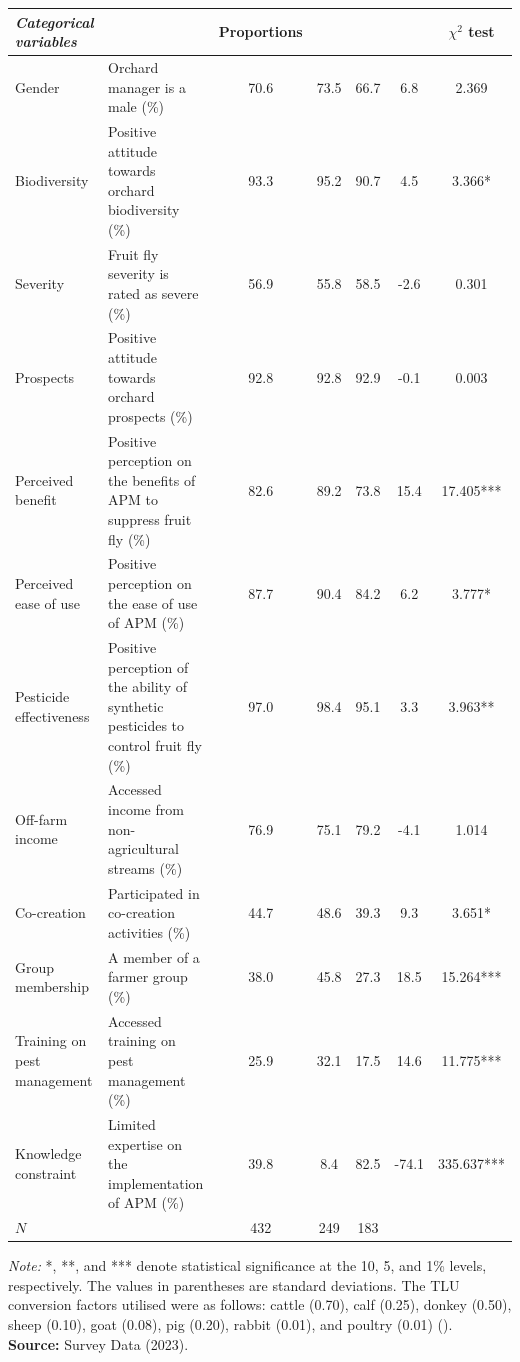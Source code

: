 \documentclass[fleqn,twoside,reqno]{article}
\begin{document}
\begin{table}
\begin{adjustbox}{width=1\textwidth, center}
\begin{tabular}{l >{\raggedright\arraybackslash}p{8cm} ccccc}
            \midrule
            \textbf{\textit{Categorical variables}} & & Proportions & & & & $\chi^2$ test\\
            \midrule
            Gender & Orchard manager is a male (\%) & 70.6 & 73.5 & 66.7 & 6.8 & 2.369 \\
            Biodiversity & Positive attitude towards orchard biodiversity (\%) & 93.3 & 95.2 & 90.7 & 4.5 &3.366*\\
            Severity & Fruit fly severity is rated as severe (\%) & 56.9 & 55.8 & 58.5 & -2.6 & 0.301 \\
            Prospects & Positive attitude towards orchard prospects (\%) & 92.8 & 92.8 & 92.9 & -0.1 & 0.003\\
            Perceived benefit & Positive perception on the benefits of APM to suppress fruit fly (\%) & 82.6 & 89.2 & 73.8 & 15.4 & 17.405***\\
            Perceived ease of use & Positive perception on the ease of use of APM (\%) & 87.7 & 90.4 & 84.2 & 6.2 & 3.777*\\
            Pesticide effectiveness & Positive perception of the ability of synthetic pesticides to control fruit fly (\%) & 97.0 & 98.4 & 95.1 & 3.3 & 3.963**\\
            Off-farm income & Accessed income from non-agricultural streams (\%) & 76.9 & 75.1 & 79.2 & -4.1 & 1.014\\
            Co-creation & Participated in co-creation activities (\%) & 44.7 & 48.6 & 39.3 & 9.3 & 3.651*\\
            Group membership & A member of a farmer group (\%) & 38.0 & 45.8 & 27.3 & 18.5 & 15.264***\\
            Training on pest management & Accessed training on pest management (\%) & 25.9 & 32.1 & 17.5 & 14.6 & 11.775***\\
            Knowledge constraint & Limited expertise on the implementation of APM (\%) & 39.8 & 8.4 & 82.5 & -74.1 & 335.637***\\
            \midrule
            $N$ & & 432 & 249 & 183 & & \\
            \bottomrule
        \end{tabular}
    \end{adjustbox}
    \smallskip
    \parbox{.9\textwidth}{\textit{Note:} *, **, and *** denote statistical significance at the 10, 5, and 1\% levels, respectively. The values in parentheses are standard deviations. The TLU conversion factors utilised were as follows: cattle (0.70), calf (0.25), donkey (0.50), sheep (0.10), goat (0.08), pig (0.20), rabbit (0.01), and poultry (0.01) (\cite{FAO1993}).\\
        \textbf{Source:} Survey Data (2023).}
\end{table}
\end{document}
